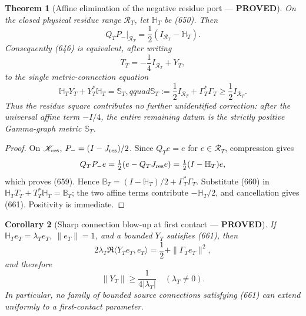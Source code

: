 \documentclass[11pt]{article}
\newtheorem{theorem}{Theorem}
\newtheorem{corollary}[theorem]{Corollary}
\newcommand{\PROVED}{\textcolor{green!45!black}{\textbf{PROVED}}}
\begin{document}
\begin{theorem}[Affine elimination of the negative residue port ---
\PROVED]
On the closed physical residue range \(\mathscr R_T\), let
\(\mathbb H_T\) be (650).  Then
\begin{equation}
 Q_TP_-\big|_{\mathscr R_T}
 =\frac12(I_{\mathscr R_T}-\mathbb H_T).             \tag{659}
\end{equation}
Consequently (646) is equivalent, after writing
\begin{equation}
 T_T=-\frac14I_{\mathscr R_T}+Y_T,                  \tag{660}
\end{equation}
to the single metric-connection equation
\begin{equation}
 \boxed{
 \mathbb H_TY_T+Y_T^*\mathbb H_T
 =\mathbb S_T,qquad
 \mathbb S_T:=\frac12I_{\mathscr R_T}
                 +\Gamma_T^*\Gamma_T
 \ge\frac12I_{\mathscr R_T}.}                      \tag{661}
\end{equation}
Thus the residue square contributes no further unidentified correction:
after the universal affine term \(-I/4\), the entire remaining datum is
the strictly positive Gamma-graph metric \(\mathbb S_T\).
\end{theorem}

\begin{proof}
On \(\mathscr K_{\rm res}\),
\(P_-=(I-J_{\rm res})/2\).  Since \(Q_Te=e\) for
\(e\in\mathscr R_T\), compression gives
\[
 Q_TP_-e=\tfrac12(e-Q_TJ_{\rm res}e)
          =\tfrac12(I-\mathbb H_T)e,
\]
which proves (659).  Hence
\(\mathbb B_T=(I-\mathbb H_T)/2+\Gamma_T^*\Gamma_T\).
Substitute (660) in
\(\mathbb H_TT_T+T_T^*\mathbb H_T=\mathbb B_T\);
the two affine terms contribute \(-\mathbb H_T/2\), and cancellation gives
(661).  Positivity is immediate.
\end{proof}

\begin{corollary}[Sharp connection blow-up at first contact --- \PROVED]
If \(\mathbb H_Te_T=\lambda_Te_T\), \(\|e_T\|=1\), and a bounded
\(Y_T\) satisfies (661), then
\begin{equation}
 2\lambda_T\Re\langle Y_Te_T,e_T\rangle
 =\frac12+\|\Gamma_Te_T\|^2,                       \tag{662}
\end{equation}
and therefore
\[
 \|Y_T\|\ge\frac{1}{4|\lambda_T|}
 \quad(\lambda_T\ne0).
\]
In particular, no family of bounded source connections satisfying (661)
can extend uniformly to a first-contact parameter.
\end{corollary}
\end{document}
